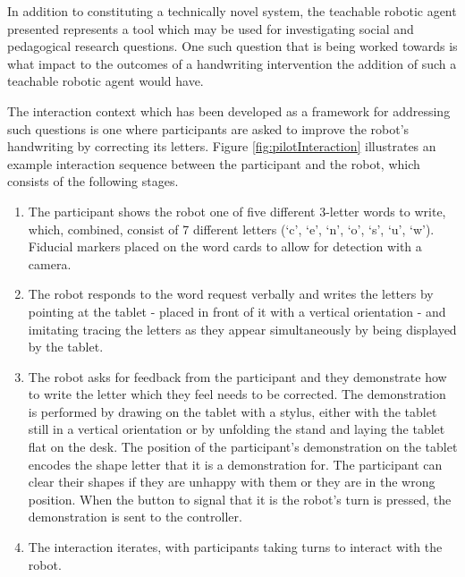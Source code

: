 \documentclass{sig-alternate}
\begin{document}
In addition to constituting a technically novel system, the teachable robotic
agent presented represents a tool which may be used for investigating social and
pedagogical research questions. One such question that is being worked towards
is what impact to the outcomes of a handwriting intervention the addition of
such a teachable robotic agent would have. 


The interaction context which has been developed as a framework for addressing
such questions is one where participants are asked to improve the robot's
handwriting by correcting its letters. Figure \ref{fig:pilotInteraction}
illustrates an example interaction sequence between the participant and the
robot, which consists of the following stages.

\begin{enumerate}

    \item The participant shows the robot one of five different 3-letter words
        to write, which, combined, consist of 7 different letters (`c', `e',
        `n', `o', `s', `u', `w'). Fiducial markers placed on the word cards to
        allow for detection with a camera. 

    \item The robot responds to the word request verbally and writes the letters
        by pointing at the tablet - placed in front of it with a vertical
        orientation - and imitating tracing the letters as they appear
        simultaneously by being displayed by the tablet. 

    \item The robot asks for feedback from the participant and they demonstrate
        how to write the letter which they feel needs to be corrected. The
        demonstration is performed by drawing on the tablet with a stylus,
        either with the tablet still in a vertical orientation or by unfolding
        the stand and laying the tablet flat on the desk. The position of the
        participant's demonstration on the tablet encodes the shape letter that
        it is a demonstration for. The participant can clear their shapes if
        they are unhappy with them or they are in the wrong position. When the
        button to signal that it is the robot's turn is pressed, the
        demonstration is sent to the controller.

    \item The interaction iterates, with participants taking turns to interact
        with the robot.

\end{enumerate}
\end{document}
